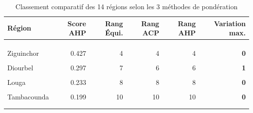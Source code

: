 \documentclass[
]{article}
\begin{document}
\begin{longtable}[t]{lrrrr>{}r}
\caption{\label{tab:tab-rangs}Classement comparatif des 14 régions selon les 3 méthodes de pondération}\\
\toprule
Région & Score AHP & Rang Équi. & Rang ACP & Rang AHP & Variation max.\\
\midrule
\cellcolor[HTML]{D4EDDA}{\cellcolor{gray!10}{Dakar}} & \cellcolor[HTML]{D4EDDA}{\cellcolor{gray!10}{0.871}} & \cellcolor[HTML]{D4EDDA}{\cellcolor{gray!10}{1}} & \cellcolor[HTML]{D4EDDA}{\cellcolor{gray!10}{1}} & \cellcolor[HTML]{D4EDDA}{\cellcolor{gray!10}{1}} & \textbf{\cellcolor[HTML]{D4EDDA}{\cellcolor{gray!10}{0}}}\\
\cellcolor[HTML]{D4EDDA}{Thiès} & \cellcolor[HTML]{D4EDDA}{0.519} & \cellcolor[HTML]{D4EDDA}{2} & \cellcolor[HTML]{D4EDDA}{2} & \cellcolor[HTML]{D4EDDA}{2} & \textbf{\cellcolor[HTML]{D4EDDA}{0}}\\
\cellcolor[HTML]{D4EDDA}{\cellcolor{gray!10}{Saint-Louis}} & \cellcolor[HTML]{D4EDDA}{\cellcolor{gray!10}{0.462}} & \cellcolor[HTML]{D4EDDA}{\cellcolor{gray!10}{3}} & \cellcolor[HTML]{D4EDDA}{\cellcolor{gray!10}{3}} & \cellcolor[HTML]{D4EDDA}{\cellcolor{gray!10}{3}} & \textbf{\cellcolor[HTML]{D4EDDA}{\cellcolor{gray!10}{0}}}\\
Ziguinchor & 0.427 & 4 & 4 & 4 & \textbf{0}\\
\cellcolor{gray!10}{Kaolack} & \cellcolor{gray!10}{0.388} & \cellcolor{gray!10}{5} & \cellcolor{gray!10}{5} & \cellcolor{gray!10}{5} & \textbf{\cellcolor{gray!10}{0}}\\
\addlinespace
Diourbel & 0.297 & 7 & 6 & 6 & \textbf{1}\\
\cellcolor{gray!10}{Fatick} & \cellcolor{gray!10}{0.296} & \cellcolor{gray!10}{6} & \cellcolor{gray!10}{7} & \cellcolor{gray!10}{7} & \textbf{\cellcolor{gray!10}{1}}\\
Louga & 0.233 & 8 & 8 & 8 & \textbf{0}\\
\cellcolor{gray!10}{Matam} & \cellcolor{gray!10}{0.213} & \cellcolor{gray!10}{9} & \cellcolor{gray!10}{9} & \cellcolor{gray!10}{9} & \textbf{\cellcolor{gray!10}{0}}\\
Tambacounda & 0.199 & 10 & 10 & 10 & \textbf{0}\\
\addlinespace
\cellcolor{gray!10}{Kaffrine} & \cellcolor{gray!10}{0.193} & \cellcolor{gray!10}{11} & \cellcolor{gray!10}{11} & \cellcolor{gray!10}{11} & \textbf{\cellcolor{gray!10}{0}}\\
\cellcolor[HTML]{FADBD8}{Kolda} & \cellcolor[HTML]{FADBD8}{0.164} & \cellcolor[HTML]{FADBD8}{12} & \cellcolor[HTML]{FADBD8}{12} & \cellcolor[HTML]{FADBD8}{12} & \textbf{\cellcolor[HTML]{FADBD8}{0}}\\

\end{longtable}
\end{document}
